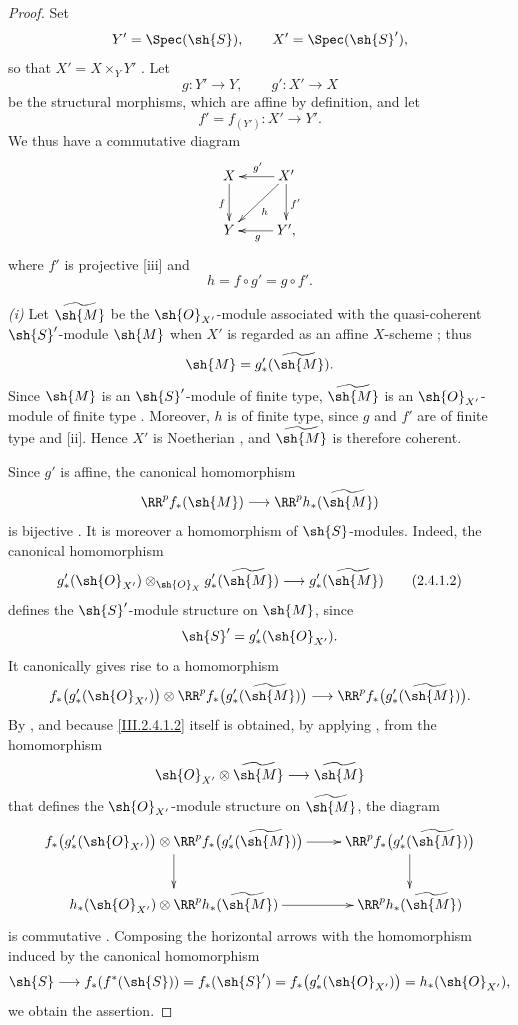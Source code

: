 \begin{proof}
Set
\[
  Y'=\Spec(\sh{S}),\qquad X'=\Spec(\sh{S}'),
\]
so that $X'=X\times_Y Y'$ .
Let
\[
  g:Y'\longrightarrow Y,\qquad g':X'\longrightarrow X
\]
be the structural morphisms, which are affine by definition, and let
\[
  f'=f_{(Y')}:X'\longrightarrow Y'.
\]
We thus have a commutative diagram
\[
  \xymatrix{
    X\ar[d]_f &
    X'\ar[l]_{g'}\ar[d]^{f'}\ar[dl]^{h}\\
    Y &
    Y'\ar[l]^{g},
  }
\]
where $f'$ is projective [iii] and
\[
  h=f\circ g'=g\circ f'.
\]

\emph{(i)} Let $\widetilde{\sh{M}}$ be the $\sh{O}_{X'}$-module associated with the quasi-coherent $\sh{S}'$-module $\sh{M}$ when $X'$ is regarded as an affine $X$-scheme ; thus
\[
  \sh{M}=g'_*(\widetilde{\sh{M}}).
\]
Since $\sh{M}$ is an $\sh{S}'$-module of finite type, $\widetilde{\sh{M}}$ is an $\sh{O}_{X'}$-module of finite type .
Moreover, $h$ is of finite type, since $g$ and $f'$ are of finite type  and [ii].
Hence $X'$ is Noetherian , and $\widetilde{\sh{M}}$ is therefore coherent.

Since $g'$ is affine, the canonical homomorphism
\[
  \RR^p f_*(\sh{M})
  \longrightarrow
  \RR^p h_*(\widetilde{\sh{M}})
\]
is bijective .
It is moreover a homomorphism of $\sh{S}$-modules.
Indeed, the canonical homomorphism
\[
\label{III.2.4.1.2}
  g'_*(\sh{O}_{X'})
  \otimes_{\sh{O}_X}
  g'_*(\widetilde{\sh{M}})
  \longrightarrow
  g'_*(\widetilde{\sh{M}})
  \tag{2.4.1.2}
\]
defines the $\sh{S}'$-module structure on $\sh{M}$, since
\[
  \sh{S}'=g'_*(\sh{O}_{X'}).
\]
It canonically gives rise to a homomorphism
\[
  f_*\bigl(g'_*(\sh{O}_{X'})\bigr)
  \otimes
  \RR^p f_*\bigl(g'_*(\widetilde{\sh{M}})\bigr)
  \longrightarrow
  \RR^p f_*\bigl(g'_*(\widetilde{\sh{M}})\bigr).
\]
By , and because \eqref{III.2.4.1.2} itself is obtained, by applying , from the homomorphism
\[
  \sh{O}_{X'}\otimes\widetilde{\sh{M}}
  \longrightarrow\widetilde{\sh{M}}
\]
that defines the $\sh{O}_{X'}$-module structure on $\widetilde{\sh{M}}$, the diagram
\[
  \xymatrix{
    f_*\bigl(g'_*(\sh{O}_{X'})\bigr)
    \otimes\RR^p f_*\bigl(g'_*(\widetilde{\sh{M}})\bigr)
    \ar[r]\ar[d] &
    \RR^p f_*\bigl(g'_*(\widetilde{\sh{M}})\bigr)\ar[d]\\
    h_*(\sh{O}_{X'})
    \otimes\RR^p h_*(\widetilde{\sh{M}})
    \ar[r] &
    \RR^p h_*(\widetilde{\sh{M}})
  }
\]
is commutative .
Composing the horizontal arrows with the homomorphism induced by the canonical homomorphism
\[
  \sh{S}
  \longrightarrow f_*(f^*(\sh{S}))
  =f_*(\sh{S}')
  =f_*\bigl(g'_*(\sh{O}_{X'})\bigr)
  =h_*(\sh{O}_{X'}),
\]
we obtain the assertion.


\end{proof}
